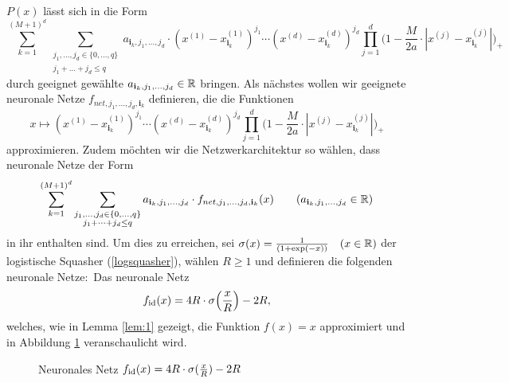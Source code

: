 $P(x)$ lässt sich in die Form 
$$\sum_{k = 1}^{(M + 1)^d} \sum_{\substack{ j_1,\dots,j_d \in \{0,\dots,q\} \\j_1+\dots +j_d \leq q}} a_{\mathbf{i}_k,j_1,\dots,j_d} \cdot (x^{(1)} - x_{\mathbf{i}_k}^{(1)})^{j_1} \cdots (x^{(d)} - x_{\mathbf{i}_k}^{(d)})^{j_d} \prod_{j = 1}^d \bigg(1 - \frac{M}{2a} \cdot |x^{(j)} - x_{\mathbf{i}_k}^{(j)}|\bigg)_+$$
durch geeignet gewählte $a_{\mathbf{i}_k,j_1,\dots,j_d} \in \mathbb{R}$ bringen.
Als nächstes wollen wir geeignete neuronale Netze $f_{net,j_1,\dots,j_d,\mathbf{i}_k}$ definieren, die die Funktionen
$$x \mapsto (x^{(1)} - x_{\mathbf{i}_k}^{(1)})^{j_1} \cdots (x^{(d)} - x_{\mathbf{i}_k}^{(d)})^{j_d} \prod_{j = 1}^d \bigg(1 - \frac{M}{2a} \cdot |x^{(j)} - x_{\mathbf{i}_k}^{(j)}|\bigg)_+$$ approximieren. Zudem möchten wir die Netzwerkarchitektur so wählen, dass neuronale Netze der Form
$$\sum_{k = 1}^{(M + 1)^d} \sum_{\substack{ j_1,\dots,j_d \in \{0,\dots,q\} \\j_1+\dots +j_d \leq q}} a_{\mathbf{i}_k,j_1,\dots,j_d} \cdot f_{net,j_1,\dots,j_d,\mathbf{i}_k}(x) \qquad (a_{\mathbf{i}_k,j_1,\dots,j_d} \in \mathbb{R})$$ in ihr enthalten sind.
Um dies zu erreichen, sei $\sigma(x) = \frac{1}{(1 + \exp(-x))} \quad (x \in \mathbb{R})$ der logistische Squasher (\ref{logsquasher}), wählen $R \geq 1$ und definieren die folgenden neuronale Netze$\colon$
Das neuronale Netz
\begin{equation}
\label{def:fid}
f_{\mathrm{id}}(x) = 4R \cdot \sigma\Big(\frac{x}{R}\Big) - 2R,
\end{equation}
welches, wie in Lemma \ref{lem:1} gezeigt, die Funktion $f(x) = x$ approximiert und in Abbildung \ref{fig:fid} veranschaulicht wird.
\begin{figure}[htp]
\centering
{}

\caption{Neuronales Netz $f_{\mathrm{id}}(x) = 4R \cdot \sigma(\frac{x}{R}) - 2R$}
\label{fig:fid}
\end{figure}

